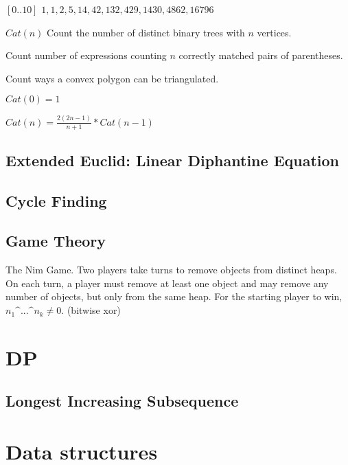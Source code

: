 \documentclass[a4paper,landscape,8pt]{article}
\begin{document}
\begin{multicols}{2}
$[0..10]$ $ 1, 1, 2, 5, 14, 42, 132, 429, 1430, 4862, 16796$

\begin{enumerate*}
    \item $Cat(n)$ Count the number of distinct binary trees with $n$ vertices.
    \item Count number of expressions counting $n$ correctly matched pairs of parentheses.
    \item Count ways a convex polygon can be triangulated.
\end{enumerate*}

$Cat(0) = 1$

$Cat(n) = \frac{2(2n - 1)}{n + 1} * Cat(n - 1)$

\subsection{Extended Euclid: Linear Diphantine Equation}


\subsection{Cycle Finding}


\subsection{Game Theory}

The Nim Game. Two players take turns to remove objects from distinct heaps. On each turn, a player must remove at least one object and may remove any number of objects, but only from the same heap. For the starting player to win, $n_1 \text{\textasciicircum{}} ... \text{\textasciicircum{}} n_k \neq 0$. (bitwise xor)


\section{DP}

\subsection{Longest Increasing Subsequence}



\section{Data structures}


\end{multicols}
\end{document}
